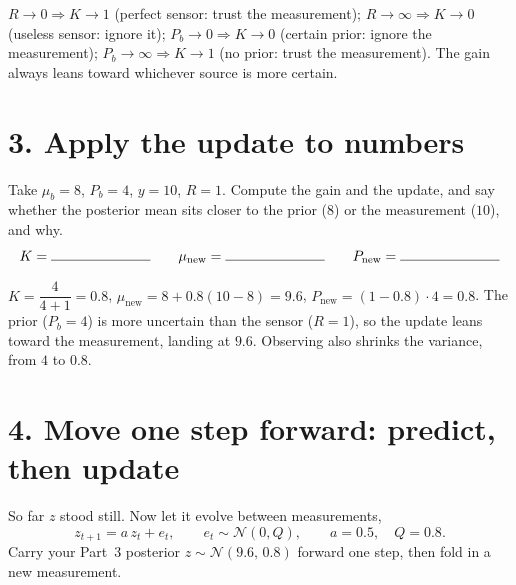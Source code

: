 \documentclass[11pt]{article}
\begin{document}
\begin{solution}
$R\to0\Rightarrow K\to1$ (perfect sensor: trust the measurement);
$R\to\infty\Rightarrow K\to0$ (useless sensor: ignore it);
$P_b\to0\Rightarrow K\to0$ (certain prior: ignore the measurement);
$P_b\to\infty\Rightarrow K\to1$ (no prior: trust the measurement). The gain always
leans toward whichever source is more certain.
\end{solution}

\section*{3. Apply the update to numbers}

Take $\mu_b = 8$, $P_b = 4$, $y = 10$, $R = 1$. Compute the gain and the update,
and say whether the posterior mean sits closer to the prior ($8$) or the
measurement ($10$), and why.
\[
  K = \rule{2.5cm}{0.4pt}
  \qquad
  \mu_{\text{new}} = \rule{2.5cm}{0.4pt}
  \qquad
  P_{\text{new}} = \rule{2.5cm}{0.4pt}
\]

\begin{solution}
$K=\dfrac{4}{4+1}=0.8$, \;$\mu_{\text{new}}=8+0.8(10-8)=9.6$, \;
$P_{\text{new}}=(1-0.8)\cdot4=0.8$. The prior ($P_b=4$) is more uncertain than the
sensor ($R=1$), so the update leans toward the measurement, landing at $9.6$.
Observing also shrinks the variance, from $4$ to $0.8$.
\end{solution}

\section*{4. Move one step forward: predict, then update}

So far $z$ stood still. Now let it evolve between measurements,
\[
  z_{t+1} = a\,z_t + e_t,
  \qquad e_t \sim \mathcal{N}(0, Q),
  \qquad a = 0.5,\quad Q = 0.8 .
\]
Carry your Part~3 posterior $z \sim \mathcal{N}(9.6,\,0.8)$ forward one step, then
fold in a new measurement.
\end{document}

